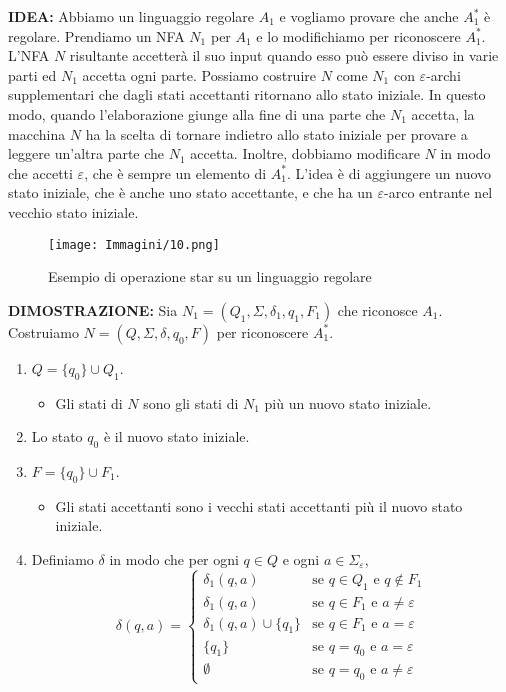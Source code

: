\documentclass{article}
\begin{document}
\textbf{IDEA:}
Abbiamo un linguaggio regolare $A_{1}$ e vogliamo provare che anche $A^{*}_{1}$ è regolare. Prendiamo un NFA $N_{1}$ per $A_{1}$ e lo modifichiamo per riconoscere $A^{*}_{1}$. L'NFA $N$ risultante accetterà il suo input quando esso può essere diviso in varie parti ed $N_{1}$ accetta ogni parte.
Possiamo costruire $N$ come $N_{1}$ con $\varepsilon$-archi supplementari che dagli stati accettanti ritornano allo stato iniziale. In questo modo, quando l'elaborazione giunge alla fine di una parte che $N_{1}$ accetta, la macchina $N$ ha la scelta di tornare indietro allo stato iniziale per provare a leggere un'altra parte che $N_{1}$ accetta. Inoltre,  dobbiamo modificare $N$ in modo che accetti $\varepsilon$, che è sempre un elemento di $A^{*}_{1}$. L'idea è di aggiungere un nuovo stato iniziale, che è anche uno stato accettante, e che ha un $\varepsilon$-arco entrante nel vecchio stato iniziale.
\vspace{1em}

\begin{figure}[H]
    \centering
    \texttt{[image: Immagini/10.png]}
    \caption{Esempio di operazione star su un linguaggio regolare}
    \label{fig:star_example1}
\end{figure}

\textbf{DIMOSTRAZIONE:}
Sia $N_{1} = (Q_{1},\Sigma,\delta_{1},q_{1},F_{1})$ che riconosce $A_{1}$.
Costruiamo $N = (Q,\Sigma,\delta,q_{0},F)$ per riconoscere $A^{*}_{1}$.
\begin{enumerate}
    \item $Q = \{q_{0}\}\cup Q_{1}.$
        \begin{itemize}
            \item Gli stati di $N$ sono gli stati di $N_{1}$ più un nuovo stato iniziale.
        \end{itemize}
    \item Lo stato $q_{0}$ è il nuovo stato iniziale.
    \item $F = \{q_{0}\} \cup F_{1}.$
        \begin{itemize}
            \item Gli stati accettanti sono i vecchi stati accettanti più il nuovo stato iniziale.
        \end{itemize}
    \item Definiamo $\delta$ in modo che per ogni $q \in Q$ e ogni $a \in \Sigma_\varepsilon$,
    \[
    \delta(q,a) =
    \begin{cases}
        \delta_{1}(q,a) & \text{se } q \in Q_{1} \text{ e } q \notin F_{1} \\
        \delta_{1}(q,a) & \text{se } q \in F_{1} \text{ e } a \neq \varepsilon \\
        \delta_{1}(q,a) \cup \{q_{1}\} & \text{se } q \in F_{1} \text{ e } a = \varepsilon \\
        \{q_{1}\} & \text{se } q = q_{0} \text{ e } a = \varepsilon \\
        \emptyset & \text{se } q = q_{0} \text{ e } a \neq \varepsilon
    \end{cases}
    \]
\end{enumerate}
\vspace{4em}
\end{document}
